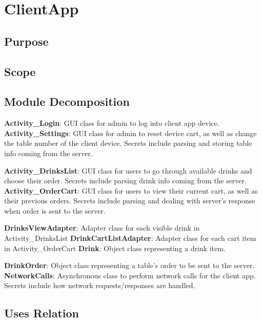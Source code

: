 \documentclass [10pt]{article}
\begin{document}

\section {ClientApp}

\subsection{Purpose}

\subsection{Scope}

\subsection{Module Decomposition}

\textbf{Activity\_Login}: GUI class for admin to log into client app device.
\textbf{Activity\_Settings}: GUI class for admin to reset device cart, as well as change the table number of the client device. Secrets include parsing and storing table info coming from the server.

\textbf{Activity\_DrinksList}: GUI class for users to go through available drinks and choose their order. Secrets include parsing drink info coming from the server.
\textbf{Activity\_OrderCart}: GUI class for users to view their current cart, as well as their previous orders. Secrets include parsing and dealing with server’s response when order is sent to the server.

\textbf{DrinksViewAdapter}: Adapter class for each visible drink in Activity\_DrinksList
\textbf{DrinkCartListAdapter}: Adapter class for each cart item in Activity\_OrderCart
\textbf{Drink}: Object class representing a drink item.

\textbf{DrinkOrder}: Object class representing a table’s order to be sent to the server. 
\textbf{NetworkCalls}: Asynchronous class to perform network calls for the client app. Secrets include how network requests/responses are handled.

\subsection{Uses Relation}
\end{document}
